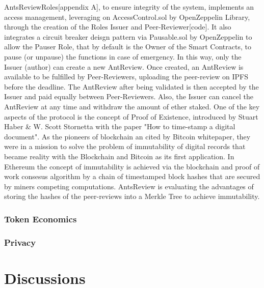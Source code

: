 \documentclass[runningheads]{llncs}
\begin{document}
AntsReviewRoles[appendix A], to ensure integrity of the system, implements an access management, leveraging on AccessControl.sol by OpenZeppelin Library, through the creation of the Roles Issuer and Peer-Reviewer[code].
\newline It also integrates a circuit breaker deisgn pattern via Pausable.sol by OpenZeppelin to allow the Pauser Role, that by default is the Owner of the Smart Contracts, to pause (or unpause) the functions in case of emergency.
\newline In this way, only the Issuer (author) can create a new AntReview.
\newline Once created, an AntReview is available to be fulfilled by Peer-Reviewers, uploading the peer-review on IPFS before the deadline.
\newline The AntReview after being validated is then accepted by the Issuer and paid equally between Peer-Reviewers.
\newline Also, the Issuer can cancel the AntReview at any time and withdraw the amount of ether staked.
\newline One of the key aspects of the protocol is the concept of Proof of Existence, introduced by Stuart Haber \& W. Scott Stornetta with the paper "How to time-stamp a digital document".
\newline As the pioneers of blockchain an cited by Bitcoin whitepaper, they were in a mission to solve the problem of immutability of digital records that became reality with the Blockchain and Bitcoin as its first application.
\newline In Ethereum the concept of immutability is achieved via the blockchain and proof of work consesus algorithm by a chain of timestamped block hashes that are secured by miners competing computations.
\newline AntsReview is evaluating the advantages of storing the hashes of the peer-reviews into a Merkle Tree to achieve immutability.

\subsubsection{Token Economics}

\subsubsection{Privacy}

\section{Discussions}
\end{document}
